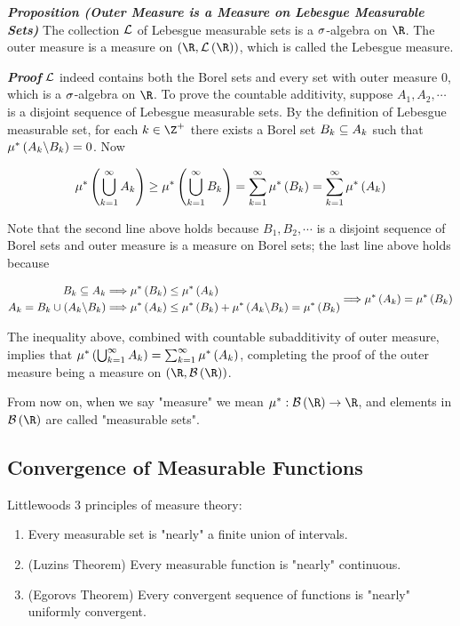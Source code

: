 \documentclass[
]{article}
\begin{document}
\emph{\textbf{Proposition (Outer Measure is a Measure on Lebesgue
Measurable Sets)}} The collection \(\mathcal L\) of Lebesgue measurable sets is
a \(\sigma\)-algebra on \(\R\). The outer measure is a measure on
\(\pr{\R,\L\pr{\R}}\), which is called the Lebesgue measure.

\emph{\textbf{Proof}} \(\mathcal L\) indeed contains both the Borel sets and
every set with outer measure \(0\), which is a \(\sigma\)-algebra on \(\R\).
To prove the countable additivity, suppose \(A_1,A_2,\cdots\) is a
disjoint sequence of Lebesgue measurable sets. By the definition of
Lebesgue measurable set, for each \(k\in \Z^+\) there exists a Borel set
\(B_k\subseteq A_k\) such that \(\mu^*\left(A_k\backslash B_k\right) = 0\). Now

\[\begin{aligned}
\mu^*\left(\bigcup_{{k} = 1}^{\infty} A_k\right)\ge \mu^*\left(\bigcup_{{k} = 1}^{\infty} B_k\right) = \sum_{{k} = 1}^{\infty} \mu^*\left(B_k\right) = \sum_{{k} = 1}^{\infty}\mu^*\left(A_k\right)
\end{aligned}\]

Note that the second line above holds because \(B_1,B_2,\cdots\) is a
disjoint sequence of Borel sets and outer measure is a measure on Borel
sets; the last line above holds because

\[\begin{aligned}
B_k\subseteq A_k& \Longrightarrow \mu^*\left(B_k\right)\le \mu^*\left(A_k\right)\\
A_k = B_k\cup \left(A_k\backslash B_k\right)& \Longrightarrow \mu^*\left(A_k\right)\le \mu^*\left(B_k\right)+\mu^*\left(A_k\backslash B_k\right) = \mu^*\left(B_k\right)
\end{aligned}\Longrightarrow \mu^*\left(A_k\right) = \mu^*\left(B_k\right)\]

The inequality above, combined with countable subadditivity of outer
measure, implies that \(\mu^*\left(\bigcup_{{k} = 1}^{\infty} A_k\right) = \sum_{{k} = 1}^{\infty}\mu^*\left(A_k\right)\),
completing the proof of the outer measure being a measure on
\(\pr{\R,\B\pr{\R}}\).

From now on, when we say "measure" we mean \(\mu^*:\B\pr{\R}\to \R\),
and elements in \(\B\pr{\R}\) are called "measurable sets".

\hypertarget{convergence-of-measurable-functions}{%
\subsection{Convergence of Measurable
Functions}\label{convergence-of-measurable-functions}}

Littlewood\textquotesingle s 3 principles of measure theory:

\begin{enumerate}
\def\labelenumi{\arabic{enumi}.}
\item
  Every measurable set is "nearly" a finite union of intervals.
\item
  (Luzin\textquotesingle s Theorem) Every measurable function is
  "nearly" continuous.
\item
  (Egorov\textquotesingle s Theorem) Every convergent sequence of
  functions is "nearly" uniformly convergent.
\end{enumerate}
\end{document}

